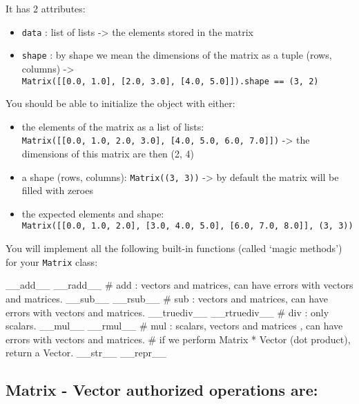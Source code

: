 \documentclass[]{article}
\newenvironment{Shaded}{\begin{snugshade}}{\end{snugshade}}
\newcommand{\CommentTok}[1]{\textcolor[rgb]{0.48,0.49,0.49}{#1}}
\newcommand{\FunctionTok}[1]{\textcolor[rgb]{0.56,0.27,0.68}{#1}}
\begin{document}
It has 2 attributes:

\begin{itemize}
\item
  \texttt{data} : list of lists -\textgreater{} the elements stored in
  the matrix
\item
  \texttt{shape} : by shape we mean the dimensions of the matrix as a
  tuple (rows, columns) -\textgreater{}
  \texttt{Matrix({[}{[}0.0,\ 1.0{]},\ {[}2.0,\ 3.0{]},\ {[}4.0,\ 5.0{]}{]}).shape\ ==\ (3,\ 2)}
\end{itemize}

You should be able to initialize the object with either:

\begin{itemize}
\item
  the elements of the matrix as a list of lists:
  \texttt{Matrix({[}{[}0.0,\ 1.0,\ 2.0,\ 3.0{]},\ {[}4.0,\ 5.0,\ 6.0,\ 7.0{]}{]})}
  -\textgreater{} the dimensions of this matrix are then (2, 4)
\item
  a shape (rows, columns): \texttt{Matrix((3,\ 3))} -\textgreater{} by
  default the matrix will be filled with zeroes
\item
  the expected elements and shape:
  \texttt{Matrix({[}{[}0.0,\ 1.0,\ 2.0{]},\ {[}3.0,\ 4.0,\ 5.0{]},\ {[}6.0,\ 7.0,\ 8.0{]}{]},\ (3,\ 3))}
\end{itemize}

You will implement all the following built-in functions (called `magic
methods') for your \texttt{Matrix} class:

\begin{Shaded}
\begin{Highlighting}[]
    \FunctionTok{__add__}
    \FunctionTok{__radd__}
    \CommentTok{# add : vectors and matrices, can have errors with vectors and matrices.}
    \FunctionTok{__sub__}
    \FunctionTok{__rsub__}
    \CommentTok{# sub : vectors and matrices, can have errors with vectors and matrices.}
    \FunctionTok{__truediv__}
    \FunctionTok{__rtruediv__}
    \CommentTok{# div : only scalars.}
    \FunctionTok{__mul__}
    \FunctionTok{__rmul__}
    \CommentTok{# mul : scalars, vectors and matrices , can have errors with vectors and matrices.}
    \CommentTok{# if we perform Matrix * Vector (dot product), return a Vector.}
    \FunctionTok{__str__}
    \FunctionTok{__repr__}
\end{Highlighting}
\end{Shaded}

\hypertarget{matrix---vector-authorized-operations-are}{%
\subsection{Matrix - Vector authorized operations
are:}\label{matrix---vector-authorized-operations-are}}
\end{document}
